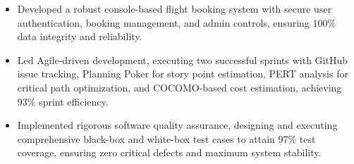 \begin{samepage}
{
  {\begin{itemize}
    \item Developed a robust console-based flight booking system with secure user authentication, booking management, and admin controls, ensuring 100\% data integrity and reliability.
    \item Led Agile-driven development, executing two successful sprints with GitHub issue tracking, Planning Poker for story point estimation, PERT analysis for critical path optimization, and COCOMO-based cost estimation, achieving 93\% sprint efficiency.
    \item Implemented rigorous software quality assurance, designing and executing comprehensive black-box and white-box test cases to attain 97\% test coverage, ensuring zero critical defects and maximum system stability.
  \end{itemize}
  }
}
\end{samepage}
